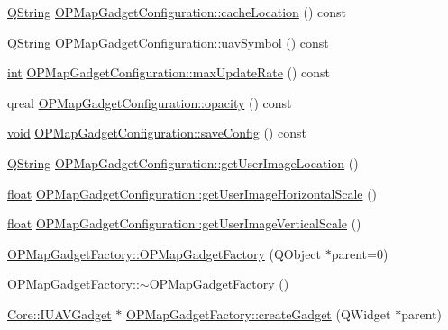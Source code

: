\begin{DoxyCompactItemize}
\item 
\hyperlink{group___u_a_v_objects_plugin_gab9d252f49c333c94a72f97ce3105a32d}{Q\-String} \hyperlink{group___o_p_map_plugin_gabcd898428bb8b8e721deabdec17009e0}{O\-P\-Map\-Gadget\-Configuration\-::cache\-Location} () const 
\item 
\hyperlink{group___u_a_v_objects_plugin_gab9d252f49c333c94a72f97ce3105a32d}{Q\-String} \hyperlink{group___o_p_map_plugin_ga6dc1826f569bf6b39ff56efe116dda82}{O\-P\-Map\-Gadget\-Configuration\-::uav\-Symbol} () const 
\item 
\hyperlink{ioapi_8h_a787fa3cf048117ba7123753c1e74fcd6}{int} \hyperlink{group___o_p_map_plugin_ga4d639157ef2beb3437a7d6e4ea3c8a61}{O\-P\-Map\-Gadget\-Configuration\-::max\-Update\-Rate} () const 
\item 
qreal \hyperlink{group___o_p_map_plugin_ga9cc98eb40adba9b8b721443c2d15f01e}{O\-P\-Map\-Gadget\-Configuration\-::opacity} () const 
\item 
\hyperlink{group___u_a_v_objects_plugin_ga444cf2ff3f0ecbe028adce838d373f5c}{void} \hyperlink{group___o_p_map_plugin_ga7e3ff578900f8a9c8915321046955fc7}{O\-P\-Map\-Gadget\-Configuration\-::save\-Config} () const 
\item 
\hyperlink{group___u_a_v_objects_plugin_gab9d252f49c333c94a72f97ce3105a32d}{Q\-String} \hyperlink{group___o_p_map_plugin_ga2850b41441065cc1eefef00485f72459}{O\-P\-Map\-Gadget\-Configuration\-::get\-User\-Image\-Location} ()
\item 
\hyperlink{_super_l_u_support_8h_a6a1bb6ed41f44b60e7bd83b0e9945aa7}{float} \hyperlink{group___o_p_map_plugin_gac4cdc48b3330d034dfd37d14fccf1a26}{O\-P\-Map\-Gadget\-Configuration\-::get\-User\-Image\-Horizontal\-Scale} ()
\item 
\hyperlink{_super_l_u_support_8h_a6a1bb6ed41f44b60e7bd83b0e9945aa7}{float} \hyperlink{group___o_p_map_plugin_ga88c5753eccbe21cb720910a47efce3fe}{O\-P\-Map\-Gadget\-Configuration\-::get\-User\-Image\-Vertical\-Scale} ()
\item 
\hyperlink{group___o_p_map_plugin_ga348bc36551d757fe6accc824bda0f622}{O\-P\-Map\-Gadget\-Factory\-::\-O\-P\-Map\-Gadget\-Factory} (Q\-Object $\ast$parent=0)
\item 
\hyperlink{group___o_p_map_plugin_ga20558255cdd8731aa6edd40d797d2c02}{O\-P\-Map\-Gadget\-Factory\-::$\sim$\-O\-P\-Map\-Gadget\-Factory} ()
\item 
\hyperlink{class_core_1_1_i_u_a_v_gadget}{Core\-::\-I\-U\-A\-V\-Gadget} $\ast$ \hyperlink{group___o_p_map_plugin_ga185fdb89aa5cd90c3112f9f39333703c}{O\-P\-Map\-Gadget\-Factory\-::create\-Gadget} (Q\-Widget $\ast$parent)

\end{DoxyCompactItemize}
